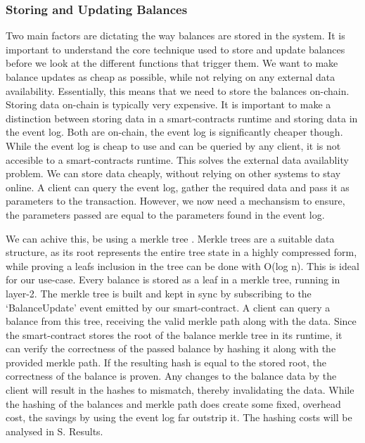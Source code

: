 \documentclass[../../thesis.tex]{subfiles}
\begin{document}
\subsubsection{Storing and Updating Balances} \label{balances}
Two main factors are dictating the way balances are stored in the system. It is important to understand the core technique used to store and update balances before we look at the different functions that trigger them. We want to make balance updates as cheap as possible, while not relying on any external data availability. Essentially, this means that we need to store the balances on-chain. Storing data on-chain is typically very expensive. It is important to make a distinction between storing data in a smart-contracts runtime and storing data in the event log. Both are on-chain, the event log is significantly cheaper though. While the event log is cheap to use and can be queried by any client, it is not accesible to a smart-contracts runtime. This solves the external data availablity problem. We can store data cheaply, without relying on other systems to stay online. A client can query the event log, gather the required data and pass it as parameters to the transaction. However, we now need a mechansism to ensure, the parameters passed are equal to the parameters found in the event log. 

We can achive this, be using a merkle tree \cite{szydlo2004merkle}. Merkle trees are a suitable data structure, as its root represents the entire tree state in a highly compressed form, while proving a leafs inclusion in the tree can be done with O(log n). This is ideal for our use-case. Every balance is stored as a leaf in a merkle tree, running in layer-2. The merkle tree is built and kept in sync by subscribing to the `BalanceUpdate' event emitted by our smart-contract. A client can query a balance from this tree, receiving the valid merkle path along with the data. Since the smart-contract stores the root of the balance merkle tree in its runtime, it can verify the correctness of the passed balance by hashing it along with the provided merkle path. If the resulting hash is equal to the stored root, the correctness of the balance is proven. Any changes to the balance data by the client will result in the hashes to mismatch, thereby invalidating the data. While the hashing of the balances and merkle path does create some fixed, overhead cost, the savings by using the event log far outstrip it. The hashing costs will be analysed in S. Results.
\end{document}

